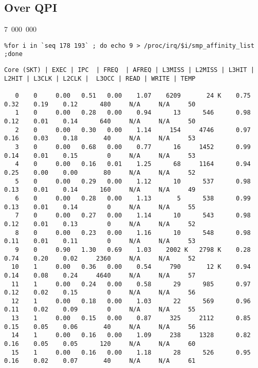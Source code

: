 \subsection{Over QPI}
7~000~000
\begin{lstlisting}
%for i in `seq 178 193` ; do echo 9 > /proc/irq/$i/smp_affinity_list ;done
\end{lstlisting}

\begin{lstlisting}
Core (SKT) | EXEC | IPC  | FREQ  | AFREQ | L3MISS | L2MISS | L3HIT | L2HIT | L3CLK | L2CLK |  L3OCC | READ | WRITE | TEMP

   0    0     0.00   0.51   0.00    1.07    6209       24 K    0.75    0.32    0.19    0.12      480     N/A     N/A     50
   1    0     0.00   0.28   0.00    0.94      13      546      0.98    0.12    0.01    0.14      640     N/A     N/A     50
   2    0     0.00   0.30   0.00    1.14     154     4746      0.97    0.16    0.03    0.18       40     N/A     N/A     53
   3    0     0.00   0.68   0.00    0.77      16     1452      0.99    0.14    0.01    0.15        0     N/A     N/A     53
   4    0     0.00   0.16   0.01    1.25      68     1164      0.94    0.25    0.00    0.00       80     N/A     N/A     52
   5    0     0.00   0.29   0.00    1.12      10      537      0.98    0.13    0.01    0.14      160     N/A     N/A     49
   6    0     0.00   0.28   0.00    1.13       5      538      0.99    0.13    0.01    0.14        0     N/A     N/A     55
   7    0     0.00   0.27   0.00    1.14      10      543      0.98    0.12    0.01    0.13        0     N/A     N/A     52
   8    0     0.00   0.23   0.00    1.16      10      548      0.98    0.11    0.01    0.11        0     N/A     N/A     53
   9    0     0.90   1.30   0.69    1.03    2002 K   2798 K    0.28    0.74    0.20    0.02     2360     N/A     N/A     52
  10    1     0.00   0.36   0.00    0.54     790       12 K    0.94    0.14    0.08    0.24     4640     N/A     N/A     57
  11    1     0.00   0.24   0.00    0.58      29      985      0.97    0.12    0.02    0.15        0     N/A     N/A     56
  12    1     0.00   0.18   0.00    1.03      22      569      0.96    0.11    0.02    0.09        0     N/A     N/A     55
  13    1     0.00   0.15   0.00    0.87     325     2112      0.85    0.15    0.05    0.06       40     N/A     N/A     56
  14    1     0.00   0.16   0.00    1.09     238     1328      0.82    0.16    0.05    0.05      120     N/A     N/A     60
  15    1     0.00   0.16   0.00    1.18      28      526      0.95    0.16    0.02    0.07       40     N/A     N/A     61

\end{lstlisting}
